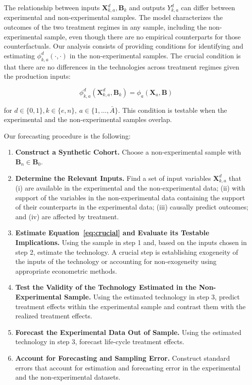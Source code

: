 The relationship between inputs $\bm{X}^d_{k,a}, \bm{B}_k$ and outputs $Y^d_{k,a}$ can differ between experimental and non-experimental samples. The model characterizes the outcomes of the two treatment regimes in any sample, including the non-experimental sample, even though there are no empirical counterparts for those counterfactuals. Our analysis consists of providing conditions for identifying and estimating $\phi^d_{k,a}\left( \cdot, \cdot \right)$ in the non-experimental samples. The crucial condition is that there are no differences in the technologies across treatment regimes given the production inputs: 

\begin{equation}
\phi^d_{k,a} (\bm{X}^d_{k,a}, \bm{B}_k) = \phi_{a} (\bm{X}_{a}, \bm{B}) \label{eq:crucial}
\end{equation}

\noindent for $d \in\{0,1\},  k\in\{e,n\}, \  a\in\{1,\dots,\bar{A}\}$. This condition is testable when the experimental and the non-experimental samples overlap.

Our forecasting procedure is the following: 

\begin{enumerate}
\item \textbf{Construct a Synthetic Cohort.} Choose a non-experimental sample with $\bm{B}_n \in \bm{B}_0$.
\item \textbf{Determine the Relevant Inputs.} Find a set of input variables $\bm{X}^d_{k,a}$ that (i) are available in the experimental and the non-experimental data; (ii) with support of the variables in the non-experimental data containing the support of their counterparts in the experimental data; (iii) causally predict outcomes; and (iv) are affected by treatment.
\item \textbf{Estimate Equation~\eqref{eq:crucial} and Evaluate its Testable Implications.} Using the sample in step 1 and, based on the inputs chosen in step 2, estimate the technology. A crucial step is establishing exogeneity of the inputs of the technology or accounting for non-exogeneity using appropriate econometric methods.
\item \textbf{Test the Validity of the Technology Estimated in the Non-Experimental Sample.} Using the estimated technology in step 3, predict treatment effects within the experimental sample and contrast them with the realized treatment effects.
\item \textbf{Forecast the Experimental Data Out of Sample.} Using the estimated technology in step 3, forecast life-cycle treatment effects. 
\item \textbf{Account for Forecasting and Sampling Error.} Construct standard errors that account for estimation and forecasting error in the experimental and the non-experimental datasets.
\end{enumerate}

